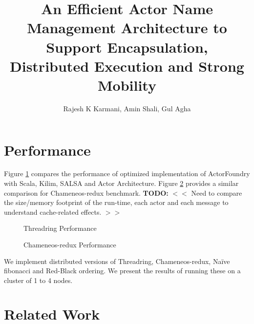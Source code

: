 \documentclass{llncs}
\title{An Efficient Actor Name Management Architecture to Support
Encapsulation, Distributed Execution and Strong Mobility}
\author{Rajesh K Karmani, Amin Shali, Gul Agha}
\institute{University of Illinois at Urbana-Champaign}
\newcommand{\todo}[1]{\textbf{TODO:} $<<$ #1 $>>$}
\begin{document}
\maketitle










\section{Performance}
Figure \ref{tr_performance} compares the performance of optimized implementation of ActorFoundry with Scala, Kilim, SALSA and Actor Architecture. Figure \ref{cham_performance} provides a similar comparison for Chameneos-redux benchmark. \todo{Need to compare the size/memory footprint of the run-time, each actor and each message to understand cache-related effects.}

\begin{figure}%
\centerline
{
}
\caption{Threadring Performance}
\label{tr_performance}
\end{figure}
\begin{figure}%
\centerline
{
}
\caption{Chameneos-redux Performance}
\label{cham_performance}
\end{figure}

We implement distributed versions of Threadring, Chameneos-redux, Na\"ive fibonacci and Red-Black ordering. We present the results of running these on a cluster of 1 to 4 nodes.

\section{Related Work}





\end{document}
